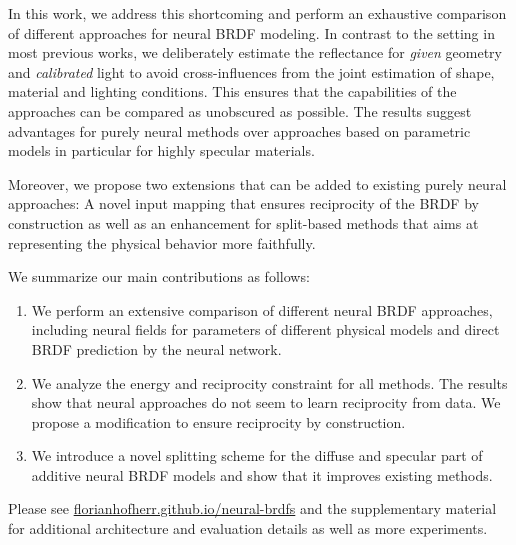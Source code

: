 In this work, we 
address this shortcoming and 
perform an exhaustive comparison of different approaches for neural BRDF modeling. In contrast to 
the setting in 
most previous works, we deliberately estimate the reflectance for \emph{given} geometry and \emph{calibrated} light to avoid cross-influences from the joint estimation of shape, material and lighting conditions. This ensures that the capabilities of the approaches can be compared as unobscured as possible. %
The results suggest advantages for purely neural methods over approaches based on parametric models in particular for highly specular materials.

Moreover, we propose two extensions that can be added to existing purely neural approaches: A novel input mapping that ensures reciprocity of the BRDF by construction as well as an enhancement for split-based methods that aims at representing the physical behavior more faithfully. 

We summarize our main contributions as follows:
\begin{enumerate}
    \item We perform an extensive comparison of different neural BRDF approaches, including neural fields for parameters of different physical models and direct BRDF prediction by the neural network.
    \item We analyze the energy and reciprocity constraint for all methods. The results show that neural approaches do not seem to learn reciprocity from data. We propose a modification to ensure reciprocity by construction.
    \item We introduce a novel splitting scheme for the diffuse and specular part of additive neural BRDF models and show that it improves existing methods.
\end{enumerate}


Please see \href{https://florianhofherr.github.io/neural-brdfs}{florianhofherr.github.io/neural-brdfs} and the supplementary material for additional architecture and evaluation details as well as more experiments.
